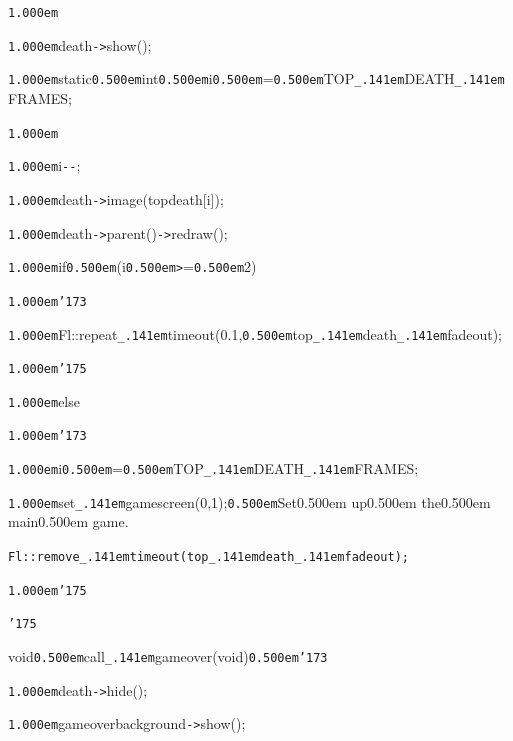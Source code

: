 \documentclass[12pt]{article}
\begin{document}
\noindent
{}{\tt\mc \kern1.000em}

\noindent
{}{\tt\mc \kern1.000em}death{\tt -}{\tt >}show();

\noindent
{}{\tt\mc \kern1.000em}static{\tt\mc \kern0.500em}int{\tt\mc \kern0.500em}i{\tt\mc \kern0.500em}={\tt\mc \kern0.500em}TOP{\tt\_\kern.141em}DEATH{\tt\_\kern.141em}FRAMES;

\noindent
{}{\tt\mc \kern1.000em}

\noindent
{}{\tt\mc \kern1.000em}i{\tt -}{\tt -};

\noindent
{}{\tt\mc \kern1.000em}death{\tt -}{\tt >}image(topdeath[i]);

\noindent
{}{\tt\mc \kern1.000em}death{\tt -}{\tt >}parent(){\tt -}{\tt >}redraw();

\noindent
{}{\tt\mc \kern1.000em}if{\tt\mc \kern0.500em}(i{\tt\mc \kern0.500em}{\tt >}={\tt\mc \kern0.500em}2)

\noindent
{}{\tt\mc \kern1.000em}{\tt\char'173}

\noindent
{}{\tt\mc \kern1.000em}Fl::repeat{\tt\_\kern.141em}timeout(0.1,{\tt\mc \kern0.500em}top{\tt\_\kern.141em}death{\tt\_\kern.141em}fadeout);

\noindent
{}{\tt\mc \kern1.000em}{\tt\char'175}

\noindent
{}{\tt\mc \kern1.000em}else

\noindent
{}{\tt\mc \kern1.000em}{\tt\char'173}

\noindent
{}{\tt\mc \kern1.000em}i{\tt\mc \kern0.500em}={\tt\mc \kern0.500em}TOP{\tt\_\kern.141em}DEATH{\tt\_\kern.141em}FRAMES;

\noindent
{}{\tt\mc \kern1.000em}set{\tt\_\kern.141em}gamescreen(0,1);{\tt\mc \kern0.500em}\rm\mc {\tt /}{\tt /}Set\kern0.500em up\kern0.500em the\kern0.500em main\kern0.500em game.

\noindent
\tt\mc {\tt\mc \kern1.000em}Fl::remove{\tt\_\kern.141em}timeout(top{\tt\_\kern.141em}death{\tt\_\kern.141em}fadeout);

\noindent
{}{\tt\mc \kern1.000em}{\tt\char'175}

\noindent
{}{\tt\char'175}

\noindent
{}\hfill

\noindent
{}void{\tt\mc \kern0.500em}call{\tt\_\kern.141em}gameover(void{\tt *}){\tt\mc \kern0.500em}{\tt\char'173}

\noindent
{}{\tt\mc \kern1.000em}death{\tt -}{\tt >}hide();

\noindent
{}{\tt\mc \kern1.000em}gameoverbackground{\tt -}{\tt >}show();
\end{document}
